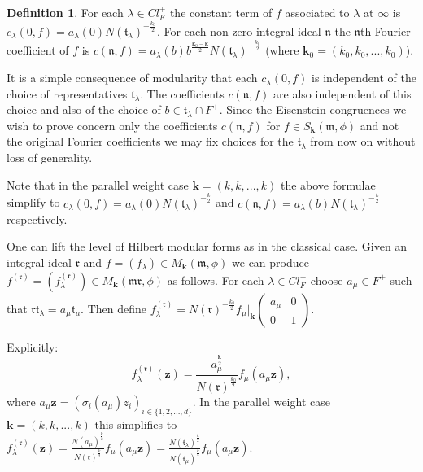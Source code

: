 \documentclass[a4paper,oneside]{amsart}
\theoremstyle{plain}
\theoremstyle{definition}
\newtheorem{define}[thm]{Definition}
\begin{document}
\begin{define}
For each $\lambda\in Cl_F^+$ the constant term of $f$ associated to $\lambda$ at $\infty$ is $c_{\lambda}(0,f) = a_\lambda(0)N(\mathfrak{t}_{\lambda})^{-\frac{k_0}{2}}$. For each non-zero integral ideal $\mathfrak{n}$ the $\mathfrak{n}$th Fourier coefficient of $f$ is $c(\mathfrak{n},f) = a_{\lambda}(b)b^{\frac{\textbf{k}_0 - \textbf{k}}{2}}N(\mathfrak{t}_{\lambda})^{-\frac{k_0}{2}}$ (where $\textbf{k}_0 = (k_0,k_0,...,k_0)$).
\end{define}

It is a simple consequence of modularity that each $c_{\lambda}(0,f)$ is independent of the choice of representatives $\mathfrak{t}_{\lambda}$. The coefficients $c(\mathfrak{n},f)$ are also independent of this choice and also of the choice of $b\in \mathfrak{t}_{\lambda}\cap F^+$. Since the Eisenstein congruences we wish to prove concern only the coefficients $c(\mathfrak{n},f)$ for $f\in S_{\textbf{k}}(\mathfrak{m},\phi)$ and not the original Fourier coefficients we may fix choices for the $\mathfrak{t}_{\lambda}$ from now on without loss of generality.

Note that in the parallel weight case $\textbf{k} = (k,k,...,k)$ the above formulae simplify to $c_{\lambda}(0,f) = a_{\lambda}(0)N(\mathfrak{t}_{\lambda})^{-\frac{k}{2}}$ and $c(\mathfrak{n},f) = a_{\lambda}(b)N(\mathfrak{t}_{\lambda})^{-\frac{k}{2}}$ respectively.

One can lift the level of Hilbert modular forms as in the classical case. Given an integral ideal $\mathfrak{r}$ and $f = (f_{\lambda})\in M_{\textbf{k}}(\mathfrak{m},\phi)$ we can produce $f^{(\mathfrak{r})} = (f^{(\mathfrak{r})}_{\lambda})\in M_{\textbf{k}}(\mathfrak{mr},\phi)$ as follows. For each $\lambda\in Cl_F^+$ choose $a_{\mu}\in F^+$ such that $\mathfrak{rt}_{\lambda} = a_{\mu}\mathfrak{t}_{\mu}$. Then define $f^{(\mathfrak{r})}_{\lambda} = N(\mathfrak{r})^{-\frac{k_0}{2}}f_{\mu}|_{\textbf{k}}\left(\begin{array}{cc}a_{\mu} & 0\\ 0 & 1\end{array}\right)$.

Explicitly: \[f^{(\mathfrak{r})}_{\lambda}(\textbf{z}) = \frac{a_{\mu}^{\frac{\textbf{k}}{2}}}{N(\mathfrak{r})^{\frac{k_0}{2}}} f_{\mu}(a_{\mu}\textbf{z}),\] where $a_{\mu}\textbf{z} = (\sigma_i(a_{\mu})z_i)_{i\in \{1,2,...,d\}}$. In the parallel weight case $\textbf{k} = (k,k,...,k)$ this simplifies to $f^{(\mathfrak{r})}_{\lambda}(\textbf{z}) = \frac{N(a_{\mu})^{\frac{k}{2}}}{N(\mathfrak{r})^{\frac{k}{2}}}f_{\mu}(a_{\mu}\textbf{z}) = \frac{N(\mathfrak{t}_{\lambda})^{\frac{k}{2}}}{N(\mathfrak{t}_{\mu})^{\frac{k}{2}}}f_{\mu}(a_{\mu}\textbf{z})$.
\end{document}
